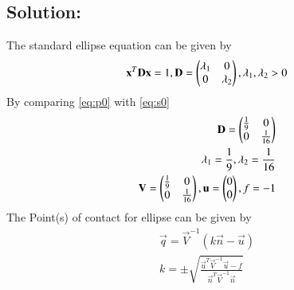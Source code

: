 \documentclass[journal,12pt,twocolumn]{IEEEtran}
\begin{document}
\subsection*{Solution:}
The standard ellipse equation can be given by
\begin{align}
\mathbf{x}^T\mathbf{D}\mathbf{x} = 1, \mathbf{D}=\begin{pmatrix}\lambda_1&0\\0&\lambda_2\end{pmatrix},\lambda_1,\lambda_2 >0
\label{eq:s0}
\end{align}
By comparing \eqref{eq:p0} with \eqref{eq:s0}
\begin{align}
\mathbf{D}=\begin{pmatrix}\frac{1}{9}&0\\0&\frac{1}{16}\end{pmatrix}\\
\label{eq:s1}
\lambda_1 = \frac{1}{9}, \lambda_2 = \frac{1}{16}\\
\label{eq:s2}
\mathbf{V}=\begin{pmatrix}\frac{1}{9}&0\\0&\frac{1}{16}\end{pmatrix},\mathbf{u} = \begin{pmatrix}0\\0\end{pmatrix}, f = -1
\end{align}
The Point(s) of contact for ellipse can be given by
\begin{align}
\label{eq:s3}
\vec{q} = \vec{V}^{-1}(k\vec{n}-\vec{u})\\
\label{eq:s4}
k = \pm \sqrt{\frac{\vec{u}^T\vec{V}^{-1}\vec{u}-f}{\vec{n}^T\vec{V}^{-1}\vec{n}}}
\end{align}
\end{document}
